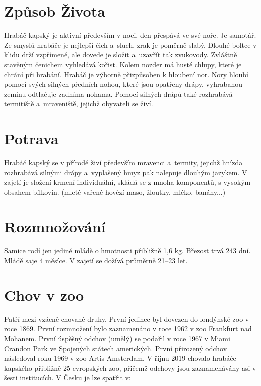 \documentclass[a4paper, 12pt]{article}
\begin{document}
\section{Způsob Života}

Hrabáč kapský je aktivní především v noci, den přespává ve své noře. Je samotář.
Ze smyslů hrabáče je nejlepší čich a~sluch, zrak je poměrně slabý. Dlouhé boltce v klidu drží vzpřímeně,
ale dovede je složit a~uzavřít tak zvukovody. Zvláštně stavěným čenichem vyhledává kořist.
Kolem nozder má husté chlupy, které je chrání při hrabání. Hrabáč je výborně přizpůsoben k hloubení nor.
Nory hloubí pomocí svých silných předních nohou, které jsou opatřeny drápy, vyhrabanou zeminu odtlačuje zadníma nohama.
Pomocí silných drápů také rozhrabává termitiště a~mraveniště, jejichž obyvateli se živí.

\section{Potrava}

Hrabáč kapský se v přírodě živí především mravenci a~termity, jejichž hnízda rozhrabává
silnými drápy a~vyplašený hmyz pak nalepuje dlouhým jazykem. V zajetí je složení krmení individuální,
skládá se z mnoha komponentů, s vysokým obsahem bílkovin.
(mleté vařené hovězí maso, žloutky, mléko, banány...)

\section{Rozmnožování}

Samice rodí jen jediné mládě o hmotnosti přibližně 1,6 kg. Březost trvá 243 dní.
Mládě saje 4 měsíce. V zajetí se dožívá průměrně 21--23 let.

\section{Chov v zoo}

Patří mezi vzácně chované druhy. První jedinec byl dovezen do londýnské zoo v roce 1869.
První rozmnožení bylo zaznamenáno v roce 1962 v zoo Frankfurt nad Mohanem.
První úspěšný odchov (umělý) se podařil v roce 1967 v Miami Crandon Park ve Spojených státech amerických.
První přirozený odchov následoval roku 1969 v zoo Artis Amsterdam.
V říjnu 2019 chovalo hrabáče kapského přibližně 25 evropských zoo,
přičemž odchovy jsou zaznamenávány asi v šesti institucích. V Česku je lze spatřit v:
\end{document}
